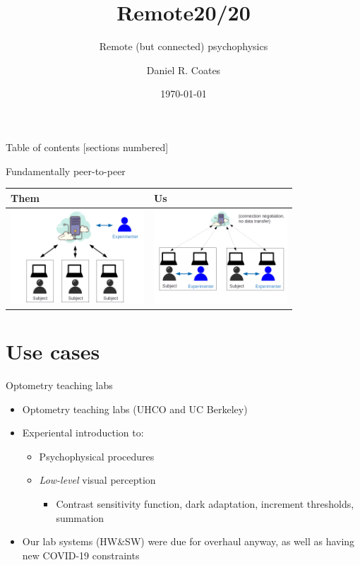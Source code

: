 \documentclass[10pt]{beamer}
\title{Remote20/20}
\subtitle{Remote (but connected) psychophysics}
\date{\today}
\author{Daniel R. Coates}
\institute{University of Houston College of Optometry}
\begin{document}
\maketitle

\begin{frame}{Table of contents}
  [sections numbered]
  \tableofcontents[hideallsubsections]
\end{frame}

\begin{frame}{Fundamentally peer-to-peer}
    \begin{tabular}{l|l}
        Them & Us \\
        \hline
	{\hfill\includegraphics[width=5cm]{../doc/clouds_openloop.png}}   &
        \pause
	{\hfill\includegraphics[width=5cm]{../doc/pairs.png}}   \\
	\end{tabular}
\end{frame}

\section{Use cases}

\begin{frame}{Optometry teaching labs}
	\begin{itemize}[<+->]
        \item Optometry teaching labs (UHCO and UC Berkeley)
        \item Experiental introduction to:
	        \begin{itemize}
                \item Psychophysical procedures
                \item \textit{Low-level} visual perception
                \begin{itemize}
                    \item Contrast sensitivity function, dark adaptation, increment thresholds, summation
            \end{itemize}
            \end{itemize}
        \item Our lab systems (HW\&SW) were due for overhaul anyway, as well as having new COVID-19 constraints
    \end{itemize}
\end{frame}
\end{document}

